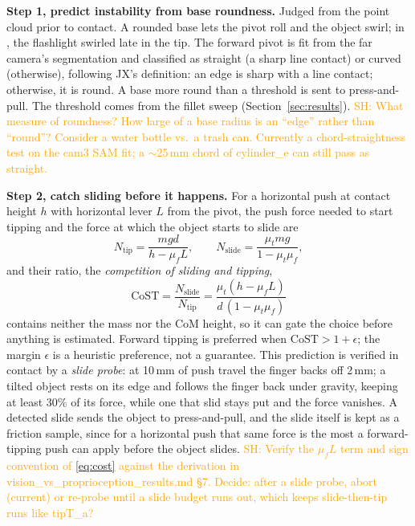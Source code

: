 \documentclass[10pt, conference]{IEEEtran}
\newcommand{\sh}[1]{\textcolor{orange}{SH: #1}}
\newcommand{\iros}{\cite{hyland_before_2026}}
\begin{document}
\noindent \textbf{Step 1, predict instability from base roundness.} Judged from the point cloud prior to contact. A rounded base lets the pivot roll and the object swirl; in \iros{}, the flashlight swirled late in the tip. The forward pivot is fit from the far camera's segmentation and classified as straight (a sharp line contact) or curved (otherwise), following JX's definition: an edge is sharp with a line contact; otherwise, it is round. A base more round than a threshold is sent to press-and-pull. The threshold comes from the fillet sweep (Section~\ref{sec:results}). \sh{What measure of roundness? How large of a base radius is an ``edge'' rather than ``round''? Consider a water bottle vs.\ a trash can. Currently a chord-straightness test on the cam3 SAM fit; a $\sim$25\,mm chord of cylinder\_e can still pass as straight.}

\noindent \textbf{Step 2, catch sliding before it happens.} For a horizontal push at contact height $h$ with horizontal lever $L$ from the pivot, the push force needed to start tipping and the force at which the object starts to slide are
\begin{equation}
    N_{\mathrm{tip}} = \frac{mgd}{h - \mu_f L}, \qquad N_{\mathrm{slide}} = \frac{\mu_t m g}{1 - \mu_t \mu_f},
\end{equation}
and their ratio, the \emph{competition of sliding and tipping},
\begin{equation}
    \boxed{\, \mathrm{CoST} = \frac{N_{\mathrm{slide}}}{N_{\mathrm{tip}}} = \frac{\mu_t (h - \mu_f L)}{d\,(1 - \mu_t \mu_f)} \,}
    \label{eq:cost}
\end{equation}
contains neither the mass nor the CoM height, so it can gate the choice before anything is estimated. Forward tipping is preferred when $\mathrm{CoST} > 1 + \epsilon$; the margin $\epsilon$ is a heuristic preference, not a guarantee. This prediction is verified in contact by a \emph{slide probe}: at 10\,mm of push travel the finger backs off 2\,mm; a tilted object rests on its edge and follows the finger back under gravity, keeping at least 30\% of its force, while one that slid stays put and the force vanishes. A detected slide sends the object to press-and-pull, and the slide itself is kept as a friction sample, since for a horizontal push that same force is the most a forward-tipping push can apply before the object slides. \sh{Verify the $\mu_f L$ term and sign convention of \eqref{eq:cost} against the derivation in vision\_vs\_proprioception\_results.md \S7. Decide: after a slide probe, abort (current) or re-probe until a slide budget runs out, which keeps slide-then-tip runs like tipT\_a?}
\end{document}
